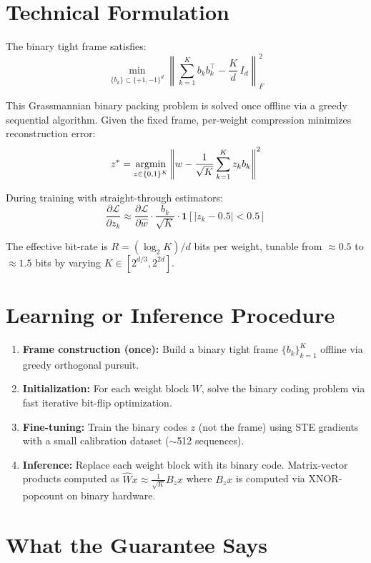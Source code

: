 \documentclass[10pt,twocolumn]{article}
\begin{document}
\section{Technical Formulation}

The binary tight frame satisfies:
\[
\min_{\{b_k\} \subset \{+1,-1\}^d}
\left\|\sum_{k=1}^K b_k b_k^\top - \frac{K}{d}\,I_d\right\|_F^2
\]

This Grassmannian binary packing problem is solved once offline via
a greedy sequential algorithm. Given the fixed frame, per-weight
compression minimizes reconstruction error:
\[
z^* = \operatornamewithlimits{argmin}_{z \in \{0,1\}^K}
\left\|w - \frac{1}{\sqrt{K}}\sum_{k=1}^K z_k b_k\right\|^2
\]

During training with straight-through estimators:
\[
\frac{\partial \mathcal{L}}{\partial z_k}
\approx \frac{\partial \mathcal{L}}{\partial \hat{w}} \cdot \frac{b_k}{\sqrt{K}}
\cdot \mathbf{1}\!\left[|z_k - 0.5| < 0.5\right]
\]

The effective bit-rate is $R = (\log_2 K)/d$ bits per weight,
tunable from $\approx 0.5$ to $\approx 1.5$ bits by varying $K \in [2^{d/3}, 2^{2d}]$.

\section{Learning or Inference Procedure}

\begin{enumerate}[itemsep=2pt,parsep=0pt]
  \item \textbf{Frame construction (once):} Build a binary tight frame
    $\{b_k\}_{k=1}^K$ offline via greedy orthogonal pursuit.
  \item \textbf{Initialization:} For each weight block $W$, solve the
    binary coding problem via fast iterative bit-flip optimization.
  \item \textbf{Fine-tuning:} Train the binary codes $z$ (not the frame)
    using STE gradients with a small calibration dataset ($\sim$512 sequences).
  \item \textbf{Inference:} Replace each weight block with its binary code.
    Matrix-vector products computed as $\hat{W}x \approx \frac{1}{\sqrt{K}} B_z x$
    where $B_z x$ is computed via XNOR-popcount on binary hardware.
\end{enumerate}

\section{What the Guarantee Says}
\end{document}

